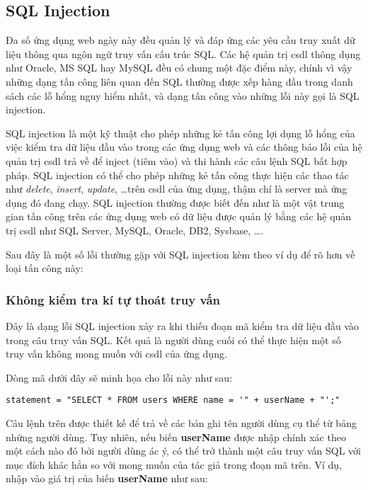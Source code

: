 \documentclass[../main-report.tex]{subfiles}
\begin{document}
\subsection{SQL Injection}
Đa số ứng dụng web ngày này đều quản lý và đáp ứng các yêu cầu truy xuất dữ liệu
thông qua ngôn ngữ truy vấn cấu trúc SQL. Các hệ quản trị \acrfull{csdl} thông dụng
như Oracle, MS SQL hay MySQL đều có chung một đặc điểm này, chính vì vậy những
dạng tấn công liên quan đến SQL thường được xếp hàng đầu trong danh sách các lỗ hổng nguy hiểm nhất, và dạng tấn công vào những lỗi này gọi là SQL injection.

SQL injection là một kỹ thuật cho phép những kẻ tấn công lợi dụng lỗ hổng của việc kiểm tra dữ liệu đầu vào trong các ứng dụng web và các thông báo lỗi của hệ quản trị \acrshort{csdl} trả về để inject (tiêm vào) và thi hành các câu lệnh SQL bất hợp pháp. SQL injection có thể cho phép những kẻ tấn công thực hiện các thao tác như \emph{delete}, \emph{insert}, \emph{update}, \ldots trên \acrshort{csdl} của ứng dụng, thậm chí là server mà ứng dụng đó đang chạy. SQL injection thường được biết đến như là một vật trung gian tấn công trên các ứng dụng web có dữ liệu được quản lý bằng các hệ quản trị \acrshort{csdl} như SQL Server, MySQL, Oracle, DB2, Sysbase, \ldots.

Sau đây là một số lỗi thường gặp với SQL injection kèm theo ví dụ để rõ hơn về loại tấn công này:

\subsubsection*{Không kiểm tra kí tự thoát truy vấn}
Đây là dạng lỗi SQL injection xảy ra khi thiếu đoạn mã kiểm tra dữ liệu đầu vào trong câu truy vấn SQL. Kết quả là người dùng cuối có thể thực hiện một số truy vấn không mong muốn với \acrshort{csdl} của ứng dụng.

\begin{example}
Dòng mã dưới đây sẽ minh họa cho lỗi này như sau:

\begin{lstlisting}
statement = "SELECT * FROM users WHERE name = '" + userName + "';"
\end{lstlisting}
\end{example}

Câu lệnh trên được thiết kế để trả về các bản ghi tên người dùng cụ thể từ bảng những người dùng. Tuy nhiên, nếu biến \textbf{userName} được nhập chính xác theo một cách nào đó bởi người dùng ác ý, có thể trở thành một câu truy vấn SQL với mục đích khác hẳn so với mong muốn của tác giả trong đoạn mã trên. Ví dụ, nhập vào giá trị của biến \textbf{userName} như sau:
\end{document}
